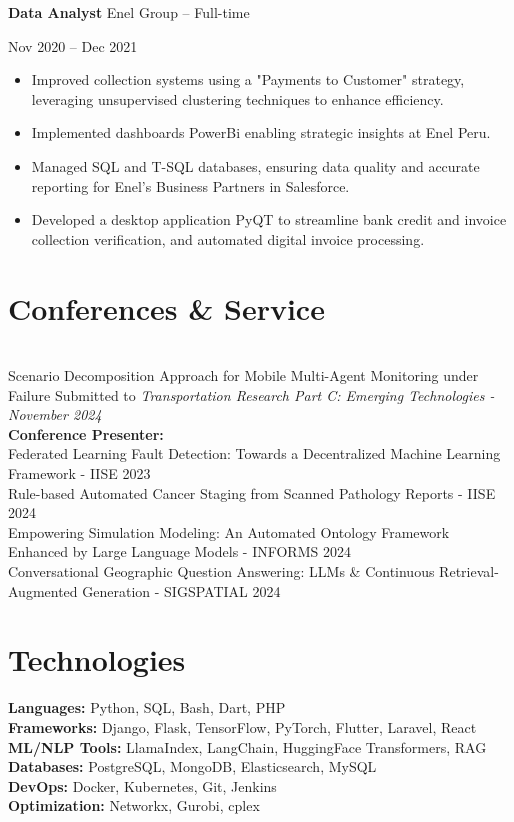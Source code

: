 \documentclass[10pt, letterpaper]{article}
\newenvironment{highlights}{
    \begin{itemize}[
        topsep=0.10 cm,
        parsep=0.10 cm,
        partopsep=0pt,
        itemsep=0pt,
        leftmargin=0 cm + 10pt
    ]
}{
    \end{itemize}
} %
\newenvironment{twocolentry}[2][]{
    \onecolentry
    \def\secondColumn{#2}
    \setcolumnwidth{\fill, 4.5 cm}
    \begin{paracol}{2}
}{
    \switchcolumn \raggedleft \secondColumn
    \end{paracol}
    \endonecolentry
} %
\begin{document}
\begin{twocolentry}{Nov 2020 – Dec 2021}
    \textbf{Data Analyst} \textbar Enel Group – Full-time
\end{twocolentry}
\begin{highlights}
    \item Improved collection systems using a "Payments to Customer" strategy, leveraging unsupervised clustering techniques to enhance efficiency.
    \item Implemented dashboards PowerBi enabling strategic insights at Enel Peru.
    \item Managed SQL and T-SQL databases, ensuring data quality and accurate reporting for Enel's Business Partners in Salesforce.
    \item Developed a desktop application PyQT to streamline bank credit and invoice collection verification, and automated digital invoice processing.
\end{highlights}

\vspace{0.3cm}





\section*{Conferences \& Service}
\\
Scenario Decomposition Approach for Mobile Multi-Agent Monitoring under Failure
Submitted to \textit{Transportation Research Part C: Emerging Technologies - November 2024} \\


\textbf{Conference Presenter:}\\
Federated Learning Fault Detection: Towards a Decentralized Machine Learning Framework - IISE 2023\\
Rule-based Automated Cancer Staging from Scanned Pathology Reports - IISE 2024\\
Empowering Simulation Modeling: An Automated Ontology Framework Enhanced by Large Language Models - INFORMS 2024\\
Conversational Geographic Question Answering: LLMs \& Continuous Retrieval-Augmented Generation - SIGSPATIAL 2024\\


\section*{Technologies}
\begin{multicols}{2}
    \textbf{Languages:} Python, SQL, Bash, Dart, PHP \\
    \textbf{Frameworks:} Django, Flask, TensorFlow, PyTorch, Flutter, Laravel, React \\
    \textbf{ML/NLP Tools:} LlamaIndex, LangChain, HuggingFace Transformers, RAG \\
    \textbf{Databases:} PostgreSQL, MongoDB, Elasticsearch, MySQL \\
    \textbf{DevOps:} Docker, Kubernetes, Git, Jenkins \\
    \textbf{Optimization:} Networkx, Gurobi, cplex
\end{multicols}

    
\end{document}
